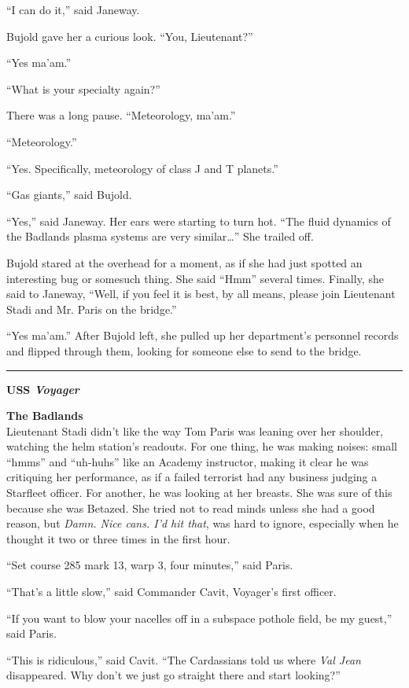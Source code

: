 \documentclass[twoside,letterpaper,12pt]{memoir}
\begin{document}
``I can do it,'' said Janeway.

Bujold gave her a curious look. ``You, Lieutenant?''

``Yes ma'am.''

``What is your specialty again?''

There was a long pause. ``Meteorology, ma'am.''

``Meteorology.''

``Yes. Specifically, meteorology of class J and T planets.''

``Gas giants,'' said Bujold.

``Yes,'' said Janeway. Her ears were starting to turn hot. ``The fluid dynamics of the Badlands plasma systems are very similar\ldots '' She trailed off.

Bujold stared at the overhead for a moment, as if she had just spotted an interesting bug or somesuch thing. She said ``Hmm'' several times. Finally, she said to Janeway, ``Well, if you feel it is best, by all means, please join Lieutenant Stadi and Mr. Paris on the bridge.''

``Yes ma'am.'' After Bujold left, she pulled up her department's personnel records and flipped through them, looking for someone else to send to the bridge.

\fancybreak{\rule{3cm}{0.4 pt}}
\noindent\textbf{USS \textit{Voyager}}

\noindent\textbf{The Badlands}\\

Lieutenant Stadi didn't like the way Tom Paris was leaning over her shoulder, watching the helm station's readouts. For one thing, he was making noises: small ``hmms'' and ``uh-huhs'' like an Academy instructor, making it clear he was critiquing her performance, as if a failed terrorist had any business judging a Starfleet officer. For another, he was looking at her breasts. She was sure of this because she was Betazed. She tried not to read minds unless she had a good reason, but \textit{Damn. Nice cans. I'd hit that}, was hard to ignore, especially when he thought it two or three times in the first hour.

``Set course 285 mark 13, warp 3, four minutes,'' said Paris.

``That's a little slow,'' said Commander Cavit, Voyager's first officer.

``If you want to blow your nacelles off in a subspace pothole field, be my guest,'' said Paris.

``This is ridiculous,'' said Cavit. ``The Cardassians told us where \textit{Val Jean} disappeared. Why don't we just go straight there and start looking?''
\end{document}
